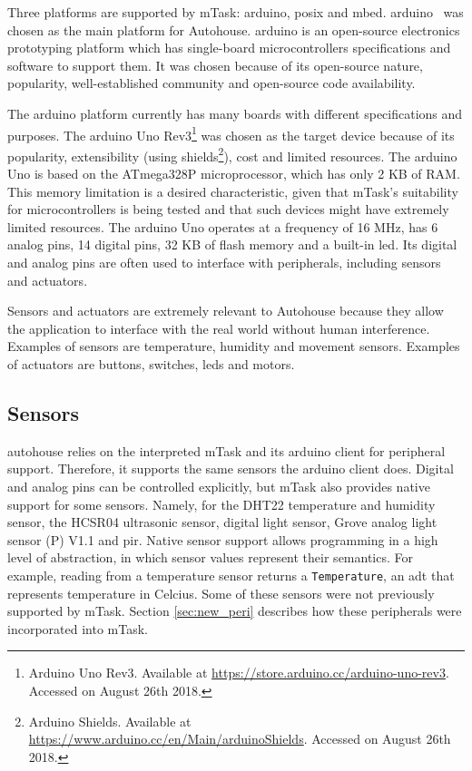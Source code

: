 Three platforms are supported by \gls{mTask}: \gls{arduino}, \acs{posix} and \gls{mbed}. \gls{arduino}~\cite{arduino} was chosen as the main platform for Autohouse. \gls{arduino} is an open-source electronics prototyping platform which has single-board microcontrollers specifications and software to support them. It was chosen because of its open-source nature, popularity, well-established community and open-source code availability.

The \gls{arduino} platform currently has many boards with different specifications and purposes. The \gls{arduino} Uno Rev3\footnote{Arduino Uno Rev3. Available at \url{https://store.arduino.cc/arduino-uno-rev3}. Accessed on August 26th 2018.} was chosen as the target device because of its popularity, extensibility (using shields\footnote{Arduino Shields. Available at \url{https://www.arduino.cc/en/Main/arduinoShields}. Accessed on August 26th 2018.}), cost and limited resources. The \gls{arduino} Uno is based on the ATmega328P microprocessor, which has only 2 KB of RAM. This memory limitation is a desired characteristic, given that \gls{mTask}'s suitability for microcontrollers is being tested and that such devices might have extremely limited resources. The \gls{arduino} Uno operates at a frequency of 16 MHz, has 6 analog pins, 14 digital pins, 32 KB of flash memory and a built-in \acs{led}. Its digital and analog pins are often used to interface with peripherals, including sensors and actuators. 

Sensors and actuators are extremely relevant to Autohouse because they allow the application to interface with the real world without human interference. Examples of sensors are temperature, humidity and movement sensors. Examples of actuators are buttons, switches, \acsp{led} and motors.

\subsection{Sensors}

\gls{autohouse} relies on the interpreted \gls{mTask} and its \gls{arduino} client for peripheral support. Therefore, it supports the same sensors the \gls{arduino} client does. Digital and analog pins can be controlled explicitly, but \gls{mTask} also provides native support for some sensors. Namely, for the DHT22 temperature and humidity sensor, the HCSR04 ultrasonic sensor, digital light sensor, Grove analog light sensor (P) V1.1 and \ac{pir}. Native sensor support allows programming in a high level of abstraction, in which sensor values represent their semantics. For example, reading from a temperature sensor returns a \texttt{Temperature}, an \acs{adt} that represents temperature in Celcius. Some of these sensors were not previously supported by \gls{mTask}. Section \ref{sec:new_peri} describes how these peripherals were incorporated into \gls{mTask}.

